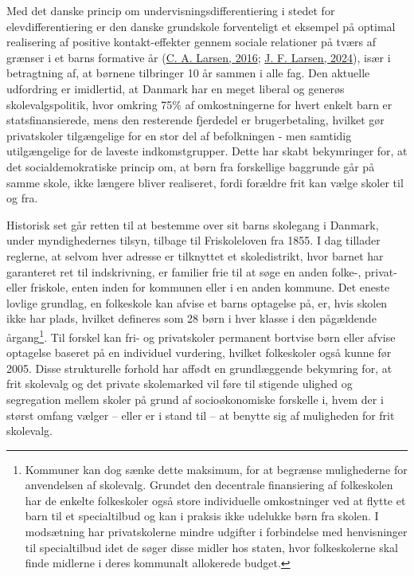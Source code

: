 \documentclass[
]{book}
\begin{document}
Med det danske princip om undervisningsdifferentiering i stedet for elevdifferentiering er den danske grundskole forventeligt et eksempel på optimal realisering af positive kontakt-effekter gennem sociale relationer på tværs af grænser i et barns formative år (\protect\hyperlink{ref-larsen2016}{C. A. Larsen, 2016}; \protect\hyperlink{ref-larsen2024a}{J. F. Larsen, 2024}), især i betragtning af, at børnene tilbringer 10 år sammen i alle fag. Den aktuelle udfordring er imidlertid, at Danmark har en meget liberal og generøs skolevalgspolitik, hvor omkring 75\% af omkostningerne for hvert enkelt barn er statsfinansierede, mens den resterende fjerdedel er brugerbetaling, hvilket gør privatskoler tilgængelige for en stor del af befolkningen - men samtidig utilgængelige for de laveste indkomstgrupper. Dette har skabt bekymringer for, at det socialdemokratiske princip om, at børn fra forskellige baggrunde går på samme skole, ikke længere bliver realiseret, fordi forældre frit kan vælge skoler til og fra.

Historisk set går retten til at bestemme over sit barns skolegang i Danmark, under myndighedernes tilsyn, tilbage til Friskoleloven fra 1855. I dag tillader reglerne, at selvom hver adresse er tilknyttet et skoledistrikt, hvor barnet har garanteret ret til indskrivning, er familier frie til at søge en anden folke-, privat- eller friskole, enten inden for kommunen eller i en anden kommune. Det eneste lovlige grundlag, en folkeskole kan afvise et barns optagelse på, er, hvis skolen ikke har plads, hvilket defineres som 28 børn i hver klasse i den pågældende årgang\footnote{Kommuner kan dog sænke dette maksimum, for at begrænse mulighederne for anvendelsen af skolevalg. Grundet den decentrale finansiering af folkeskolen har de enkelte folkeskoler også store individuelle omkostninger ved at flytte et barn til et specialtilbud og kan i praksis ikke udelukke børn fra skolen. I modsætning har privatskolerne mindre udgifter i forbindelse med henvisninger til specialtilbud idet de søger disse midler hos staten, hvor folkeskolerne skal finde midlerne i deres kommunalt allokerede budget.}. Til forskel kan fri- og privatskoler permanent bortvise børn eller afvise optagelse baseret på en individuel vurdering, hvilket folkeskoler også kunne før 2005. Disse strukturelle forhold har affødt en grundlæggende bekymring for, at frit skolevalg og det private skolemarked vil føre til stigende ulighed og segregation mellem skoler på grund af socioøkonomiske forskelle i, hvem der i størst omfang vælger -- eller er i stand til -- at benytte sig af muligheden for frit skolevalg.
\end{document}
